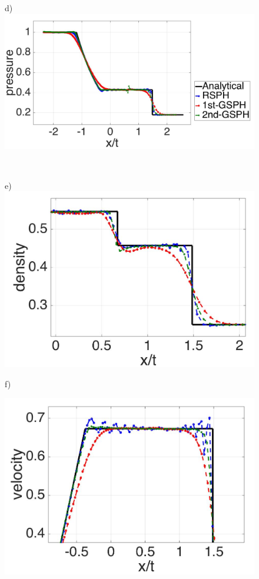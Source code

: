\begin{figure}[H]
\begin{minipage}{.45\textwidth}
    \end{minipage}%
    \begin{minipage}{.545 \textwidth}
        \centering d)
        \includegraphics[width=0.99 \textwidth,height=0.4954\textwidth]{./Figures/RCM-Sod-GSPH2-compare-p}
    \end{minipage}%
    \\
    \begin{minipage}{.45\textwidth}
        \centering e)
        \includegraphics[width=0.99 \textwidth,height=0.6\textwidth]{./Figures/RCM-Sod-GSPH2-compare-rho-zoom}
    \end{minipage}%
    \begin{minipage}{.545\textwidth}
    \centering f)
        \begin{flushleft}
        \includegraphics[width= 0.8174 \textwidth, height=0.4954 \textwidth]{./Figures/RCM-Sod-GSPH2-compare-v-zoom}    

\end{flushleft}
\end{minipage}
\end{figure}
